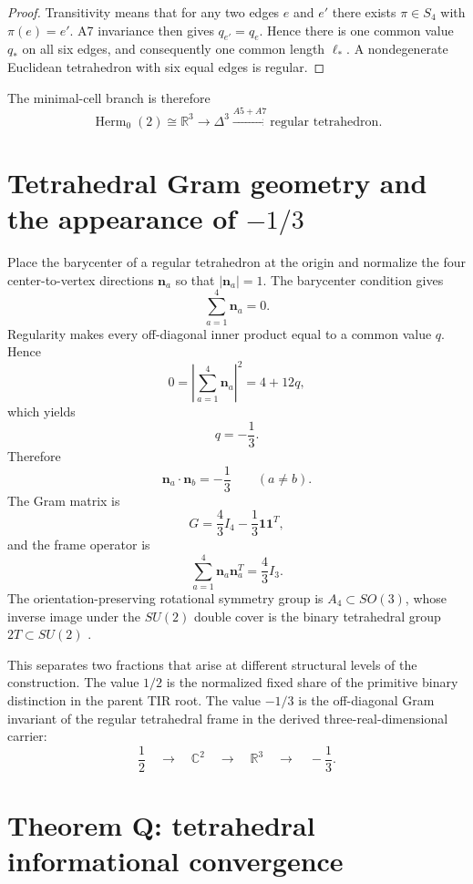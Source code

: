 \documentclass[12pt,a4paper]{article}
\newcommand{\Herm}{\operatorname{Herm}}
\newcommand{\R}{\mathbb{R}}
\newcommand{\C}{\mathbb{C}}
\newcommand{\nvec}{\bm{n}}
\begin{document}
\begin{proof}
Transitivity means that for any two edges $e$ and $e'$ there exists $\pi\in S_4$ with $\pi(e)=e'$. A7 invariance then gives $q_{e'}=q_e$. Hence there is one common value $q_*$ on all six edges, and consequently one common length $\ell_*$. A nondegenerate Euclidean tetrahedron with six equal edges is regular.
\end{proof}

The minimal-cell branch is therefore
\[
\boxed{
\Herm_0(2)\cong\R^3
\longrightarrow
\Delta^3
\xrightarrow{A5+A7}
\text{regular tetrahedron}.
}
\]

\section{Tetrahedral Gram geometry and the appearance of \texorpdfstring{$-1/3$}{-1/3}}

Place the barycenter of a regular tetrahedron at the origin and normalize the four center-to-vertex directions $\nvec_a$ so that $|\nvec_a|=1$. The barycenter condition gives
\[
\boxed{\sum_{a=1}^{4}\nvec_a=0.}
\]
Regularity makes every off-diagonal inner product equal to a common value $q$. Hence
\[
0=\left|\sum_{a=1}^{4}\nvec_a\right|^2
=4+12q,
\]
which yields
\[
\boxed{q=-\frac13.}
\]
Therefore
\[
\boxed{\nvec_a\cdot\nvec_b=-\frac13\qquad(a\neq b).}
\]
The Gram matrix is
\[
\boxed{
G=\frac43 I_4-\frac13\mathbf 1\mathbf 1^{T},
}
\]
and the frame operator is
\[
\boxed{
\sum_{a=1}^{4}\nvec_a\nvec_a^{T}=\frac43 I_3.
}
\]
The orientation-preserving rotational symmetry group is $A_4\subset SO(3)$, whose inverse image under the $SU(2)$ double cover is the binary tetrahedral group $2T\subset SU(2)$ \cite{Coxeter}.

This separates two fractions that arise at different structural levels of the construction. The value $1/2$ is the normalized fixed share of the primitive binary distinction in the parent TIR root. The value $-1/3$ is the off-diagonal Gram invariant of the regular tetrahedral frame in the derived three-real-dimensional carrier:
\[
\boxed{
\frac12\quad\longrightarrow\quad\C^2\quad\longrightarrow\quad\R^3\quad\longrightarrow\quad-\frac13.
}
\]

\section{Theorem Q: tetrahedral informational convergence}
\end{document}
